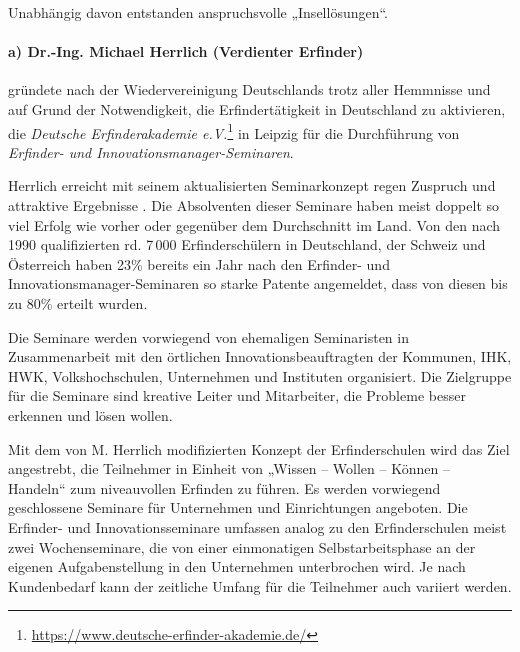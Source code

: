 \documentclass[11pt,a4paper]{article}
\begin{document}
Unabhängig davon entstanden anspruchsvolle „Insellösungen“.

\paragraph{a) Dr.-Ing. Michael Herrlich (Verdienter Erfinder)} 
gründete nach der Wiedervereinigung Deutschlands trotz aller Hemmnisse und auf
Grund der Notwendigkeit, die Erfindertätigkeit in Deutschland zu aktivieren,
die \emph{Deutsche Erfinderakademie
e.V.}\footnote{\url{https://www.deutsche-erfinder-akademie.de/}} in Leipzig
für die Durch\-füh\-rung von \emph{Erfinder- und
Innovationsmanager-Seminaren}.

Herrlich erreicht mit seinem aktualisierten Seminarkonzept regen Zuspruch und
attraktive Ergebnisse \cite{17}. Die Absolventen dieser Seminare haben meist
doppelt so viel Erfolg wie vorher oder gegenüber dem Durchschnitt im Land. Von
den nach 1990 qualifizierten rd. 7\,000 Erfinderschülern in Deutschland, der
Schweiz und Österreich haben 23\% bereits ein Jahr nach den Erfinder- und
Innovationsmanager-Seminaren so starke Patente angemeldet, dass von diesen bis
zu 80\% erteilt wurden.

Die Seminare werden vorwiegend von ehemaligen Seminaristen in Zusammenarbeit
mit den örtlichen Innovationsbeauftragten der Kommunen, IHK, HWK,
Volkshochschulen, Unternehmen und Instituten organisiert. Die Zielgruppe für
die Seminare sind kreative Leiter und Mitarbeiter, die Probleme besser
erkennen und lösen wollen.

Mit dem von M. Herrlich modifizierten Konzept der Erfinderschulen wird das
Ziel angestrebt, die Teilnehmer in Einheit von „Wissen – Wollen – Können --
Handeln“ zum niveauvollen Erfinden zu führen. Es werden vorwiegend
geschlossene Seminare für Unternehmen und Einrichtungen angeboten. Die
Erfinder- und Innovationsseminare umfassen analog zu den Erfinderschulen meist
zwei Wochenseminare, die von einer einmonatigen Selbstarbeitsphase an der
eigenen Aufgabenstellung in den Unternehmen unterbrochen wird. Je nach
Kundenbedarf kann der zeitliche Umfang für die Teilnehmer auch variiert
werden.
\end{document}
